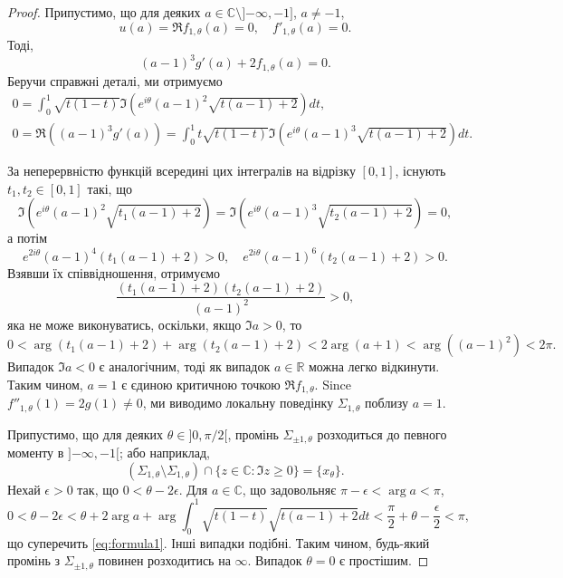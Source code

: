 \documentclass[]{article}
\theoremstyle{plain}
\begin{document}
\begin{proof}
Припустимо, що для деяких $a \in \mathbb{C} \setminus ]{-\infty}, -1]$, $a \neq -1$,
\begin{equation*}
    u(a) = \Re f_{1,\theta}(a) = 0, \quad f'_{1,\theta}(a) = 0. 
\end{equation*}
Тоді,
\begin{equation*}
    (a - 1)^3 g'(a) + 2f_{1,\theta}(a) = 0.
\end{equation*}
Беручи справжні деталі, ми отримуємо
\begin{align*}
     0 = \int_{0}^{1} \sqrt{t(1 - t)} 
\Im \left( e^{i\theta} (a - 1)^2 \sqrt{t(a - 1) + 2} \right) dt,\\
0 = \Re \left( (a - 1)^3 g'(a) \right) = \int_{0}^{1} t \sqrt{t(1 - t)} 
\Im \left( e^{i\theta} (a - 1)^3 \sqrt{t(a - 1) + 2} \right) dt.
\end{align*}

За неперервністю функцій всередині цих інтегралів на відрізку $[0, 1]$, існують $t_1, t_2 \in [0, 1]$ такі, що
\begin{equation*}
     \Im \left( e^{i\theta} (a - 1)^2 \sqrt{t_1(a - 1) + 2} \right) = \Im \left( e^{i\theta} (a - 1)^3 \sqrt{t_2(a - 1) + 2} \right) = 0,
\end{equation*}
а потім
\begin{equation*}
    e^{2i\theta} (a - 1)^4 (t_1(a - 1) + 2) > 0, \quad e^{2i\theta} (a - 1)^6 (t_2(a - 1) + 2) > 0.
\end{equation*}
Взявши їх співвідношення, отримуємо
\begin{equation*}
     \frac{(t_1(a - 1) + 2)(t_2(a - 1) + 2)}{(a - 1)^2} > 0,
\end{equation*}
яка не може виконуватись, оскільки, якщо $\Im a > 0$, то
\begin{equation*}
     0 < \arg(t_1(a - 1) + 2) + \arg(t_2(a - 1) + 2) < 2 \arg(a + 1) < \arg((a - 1)^2) < 2\pi.
\end{equation*}
Випадок $\Im a < 0$ є аналогічним, тоді як випадок $a \in \mathbb{R}$ можна легко відкинути. Таким чином, $a = 1$ є єдиною критичною точкою $\Re f_{1,\theta}$. Since $f''_{1,\theta}(1) = 2g(1) \neq 0$, ми виводимо локальну поведінку $\Sigma_{1,\theta}$ поблизу $a = 1$.

Припустимо, що для деяких $\theta \in ]0, \pi/2[$, промінь $\Sigma_{\pm 1,\theta}$ розходиться до певного моменту в $]{-\infty}, -1[$; або наприклад,
\begin{equation*}
  (\Sigma_{1,\theta} \setminus \Sigma_{1,\theta}) \cap \{ z \in \mathbb{C} : \Im z \geq 0 \} = \{x_{\theta}\}.   
\end{equation*}
Нехай $\epsilon > 0$ так, що $0 < \theta - 2\epsilon$. Для $a \in \mathbb{C}$, що задовольняє $\pi - \epsilon < \arg a < \pi$,
\begin{equation*}
    0 < \theta - 2\epsilon < \theta + 2 \arg a + \arg \int_{0}^{1} \sqrt{t(1 - t)} \sqrt{t(a - 1) + 2} dt < \frac{\pi}{2} + \theta - \frac{\epsilon}{2} < \pi,
\end{equation*}
що суперечить \eqref{eq:formula1}. Інші випадки подібні. Таким чином, будь-який промінь з $\Sigma_{\pm 1,\theta}$ повинен розходитись на $\infty$. Випадок $\theta = 0$ є простішим.


\end{proof}
\end{document}
